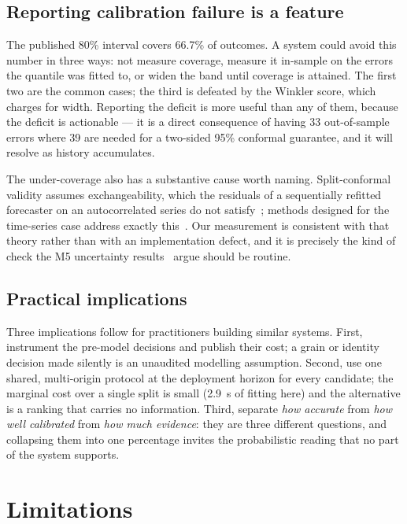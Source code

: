 \documentclass[conference]{IEEEtran}
\begin{document}
\subsection{Reporting calibration failure is a feature}

The published 80\% interval covers 66.7\% of outcomes. A system could avoid
this number in three ways: not measure coverage, measure it in-sample on the
errors the quantile was fitted to, or widen the band until coverage is
attained. The first two are the common cases; the third is defeated by the
Winkler score, which charges for width. Reporting the deficit is more useful
than any of them, because the deficit is actionable --- it is a direct
consequence of having 33 out-of-sample errors where 39 are needed for a
two-sided 95\% conformal guarantee, and it will resolve as history accumulates.

The under-coverage also has a substantive cause worth naming. Split-conformal
validity assumes exchangeability, which the residuals of a sequentially
refitted forecaster on an autocorrelated series do not
satisfy~\cite{vovk2005conformal,lei2018distfree}; methods designed for the
time-series case address exactly this~\cite{xu2021enbpi}. Our measurement is
consistent with that theory rather than with an implementation defect, and it
is precisely the kind of check the M5 uncertainty
results~\cite{makridakis2022m5unc} argue should be routine.

\subsection{Practical implications}

Three implications follow for practitioners building similar systems. First,
instrument the pre-model decisions and publish their cost; a grain or identity
decision made silently is an unaudited modelling assumption. Second, use one
shared, multi-origin protocol at the deployment horizon for every candidate;
the marginal cost over a single split is small (2.9~s of fitting here) and the
alternative is a ranking that carries no information. Third, separate
\emph{how accurate} from \emph{how well calibrated} from \emph{how much
evidence}: they are three different questions, and collapsing them into one
percentage invites the probabilistic reading that no part of the system
supports.

\section{Limitations}
\label{sec:limits}
\end{document}
